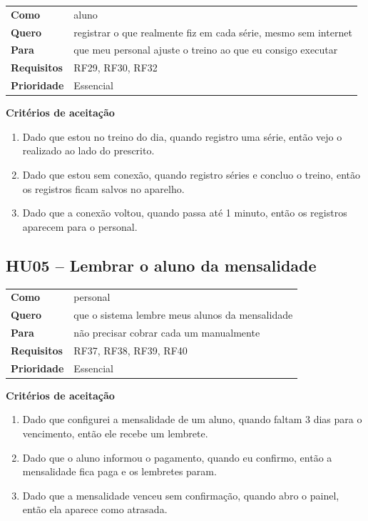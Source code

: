 \begin{tabularx}{\textwidth}{@{}l L@{}}
  \toprule
  \textbf{Como}       & aluno \\
  \textbf{Quero}      & registrar o que realmente fiz em cada série, mesmo sem internet \\
  \textbf{Para}       & que meu personal ajuste o treino ao que eu consigo executar \\
  \textbf{Requisitos} & RF29, RF30, RF32 \\
  \textbf{Prioridade} & Essencial \\
  \bottomrule
\end{tabularx}

\textbf{Critérios de aceitação}
\begin{enumerate}
  \item Dado que estou no treino do dia, quando registro uma série, então vejo o realizado ao lado do prescrito.
  \item Dado que estou sem conexão, quando registro séries e concluo o treino, então os registros ficam salvos no aparelho.
  \item Dado que a conexão voltou, quando passa até 1 minuto, então os registros aparecem para o personal.
\end{enumerate}

\subsection*{HU05 -- Lembrar o aluno da mensalidade}

\begin{tabularx}{\textwidth}{@{}l L@{}}
  \toprule
  \textbf{Como}       & personal \\
  \textbf{Quero}      & que o sistema lembre meus alunos da mensalidade \\
  \textbf{Para}       & não precisar cobrar cada um manualmente \\
  \textbf{Requisitos} & RF37, RF38, RF39, RF40 \\
  \textbf{Prioridade} & Essencial \\
  \bottomrule
\end{tabularx}

\textbf{Critérios de aceitação}
\begin{enumerate}
  \item Dado que configurei a mensalidade de um aluno, quando faltam 3 dias para o vencimento, então ele recebe um lembrete.
  \item Dado que o aluno informou o pagamento, quando eu confirmo, então a mensalidade fica paga e os lembretes param.
  \item Dado que a mensalidade venceu sem confirmação, quando abro o painel, então ela aparece como atrasada.
\end{enumerate}


